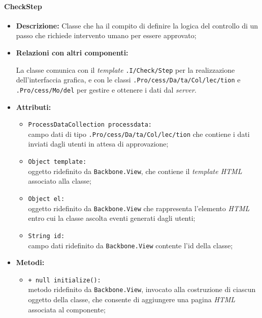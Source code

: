 \paragraph{CheckStep}
\label{checkStep}
\begin{flushleft}
\begin{itemize}
\item \textbf{Descrizione:} Classe che ha il compito di definire la logica del controllo di un passo che richiede intervento umano per essere approvato;
\item \textbf{Relazioni con altri componenti:}
\begin{sloppypar}
La classe comunica con il \textit{template} \texttt{\viewAdmin{}.I\fshyp{}Check\fshyp{}Step} per la realizzazione dell'interfaccia grafica, e con le classi \texttt{\collection{}.Pro\fshyp{}cess\fshyp{}Da\fshyp{}ta\fshyp{}Col\fshyp{}lec\fshyp{}tion} e \texttt{\model{}.Pro\fshyp{}cess\fshyp{}Mo\fshyp{}del} per gestire e ottenere i dati dal \textit{server}.
\end{sloppypar}
\item \textbf{Attributi:}
\begin{sloppypar}
\begin{itemize}
\item \texttt{ProcessDataCollection processdata:}\\ campo dati di tipo \texttt{\collection{}.Pro\fshyp{}cess\fshyp{}Da\fshyp{}ta\fshyp{}Col\fshyp{}lec\fshyp{}tion} che contiene i dati inviati dagli utenti in attesa di approvazione;
\item \texttt{Object template:}\\ oggetto ridefinito da \texttt{Backbone.View}, che contiene il \textit{template HTML} associato alla classe;
\item \texttt{Object el:}\\ oggetto ridefinito da \texttt{Backbone.View} che rappresenta l'elemento \textit{HTML} entro cui la classe ascolta eventi generati dagli utenti;
\item \texttt{String id:}\\ campo dati ridefinito da \texttt{Backbone.View} contente l'id della classe;
\end{itemize}
\end{sloppypar}
\item \textbf{Metodi:}
\begin{sloppypar}
\begin{itemize}
\item \texttt{+ null initialize():}\\ metodo ridefinito da \texttt{Backbone.View}, invocato alla costruzione di ciascun oggetto della classe, che consente di aggiungere una pagina \textit{HTML} associata al componente;

\end{itemize}
\end{sloppypar}
\end{itemize}
\end{flushleft}
